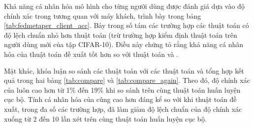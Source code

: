 \begin{table}[H]
    \centering
    \caption{Bảng độ chính xác (\%) của thuật toán FedPer và các thuật toán FedMeta-Per tính trên máy khách (dữ liệu Non-IID)}
    \label{tab:fedmetaper_client_acc}
\end{table}

Khả năng cá nhân hóa mô hình cho từng người dùng được đánh giá dựa vào độ chính xác trong tương quan với máy khách, trình bày trong bảng \ref{tab:fedmetaper_client_acc}. Bảy trong số tám các trường hợp các thuật toán  có độ lệch chuẩn nhỏ hơn thuật toán  (trừ trường hợp kiểm định thuật toán  trên người dùng mới của tập CIFAR-10). Điều này chứng tỏ rằng khả năng cá nhân hóa của thuật toán đề xuất tốt hơn so với thuật toán  và .

Mặt khác, khóa luận so sánh các thuật toán  với các thuật toán  và tổng hợp kết quả trong hai bảng \ref{tab:compare} và \ref{tab:compare_again}. Theo đó, độ chính xác của  luôn cao hơn  từ 1\% đến 19\% khi so sánh trên cùng thuật toán huấn luyện cục bộ. Tính cá nhân hóa của  cũng cao hơn đáng kể so với  khi thuật toán đề xuất, trong đa số các trường hợp, đã làm giảm độ lệch chuẩn của độ chính xác xuống từ 2 đến 10 lần xét trên cùng thuật toán huấn luyện cục bộ.


